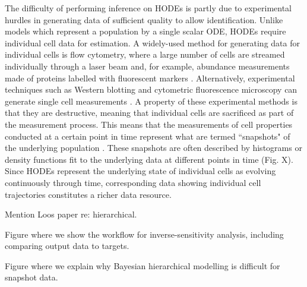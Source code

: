 \documentclass[10pt,letterpaper]{article}
\begin{document}
The difficulty of performing inference on HODEs is partly due to experimental hurdles in generating data of sufficient quality to allow identification. Unlike models which represent a population by a single scalar ODE, HODEs require individual cell data for estimation. A widely-used method for generating data for individual cells is flow cytometry, where a large number of cells are streamed individually through a laser beam and, for example, abundance measurements made of proteins labelled with fluorescent markers \cite{telford2012flow}. Alternatively, experimental techniques such as Western blotting and cytometric fluorescence microscopy can generate single cell measurements \cite{hughes2014single,hasenauer2011identification}. A property of these experimental methods is that they are destructive, meaning that individual cells are sacrificed as part of the measurement process. This means that the measurements of cell properties conducted at a certain point in time represent what are termed ``snapshots" of the underlying population \cite{hasenauer2011identification}. These snapshots are often described by histograms \cite{dixit2018maximum} or density functions \cite{waldherr2018estimation} fit to the underlying data at different points in time (Fig. X). Since HODEs represent the underlying state of individual cells as evolving continuously through time, corresponding data showing individual cell trajectories constitutes a richer data resource.


Mention Loos paper re: hierarchical.



Figure where we show the workflow for inverse-sensitivity analysis, including comparing output data to targets.

Figure where we explain why Bayesian hierarchical modelling is difficult for snapshot data.





\linenumbers
\end{document}
